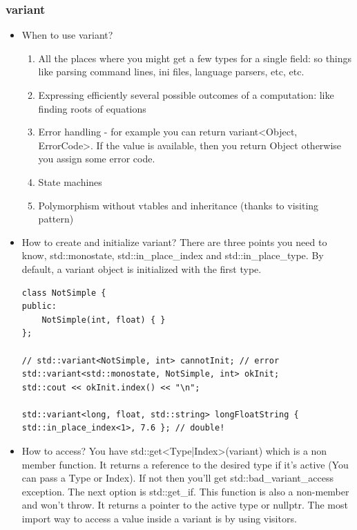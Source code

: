 \documentclass[a4paper,11pt,twoside]{book}
\begin{document}
\subsubsection{variant}

\begin{itemize}
    \item When to use variant?
        \begin{enumerate}
            \item All the places where you might get a few types for a single field: so things like parsing command lines, ini files, language parsers, etc, etc.
            \item Expressing efficiently several possible outcomes of a computation: like finding roots of equations
            \item Error handling - for example you can return variant<Object, ErrorCode>. If the value is available, then you return Object otherwise you assign some error code.
            \item State machines
            \item Polymorphism without vtables and inheritance (thanks to visiting pattern)
        \end{enumerate}

    \item How to create and initialize variant? There are three points you need to know, std::monostate, std::in\_place\_index and std::in\_place\_type. By default, a variant object is initialized with the first type.
\begin{lstlisting}
class NotSimple {
public:
    NotSimple(int, float) { }
};

// std::variant<NotSimple, int> cannotInit; // error
std::variant<std::monostate, NotSimple, int> okInit;
std::cout << okInit.index() << "\n";

std::variant<long, float, std::string> longFloatString { std::in_place_index<1>, 7.6 }; // double!
\end{lstlisting}

\item How to access?  You have std::get<Type|Index>(variant) which is a non member function. It returns a reference to the desired type if it’s active (You can pass a Type or Index). If not then you’ll get std::bad\_variant\_access exception. The next option is std::get\_if. This function is also a non-member and won’t throw. It returns a pointer to the active type or nullptr. The most import way to access a value inside a variant is by using visitors.


\end{itemize}
\end{document}
